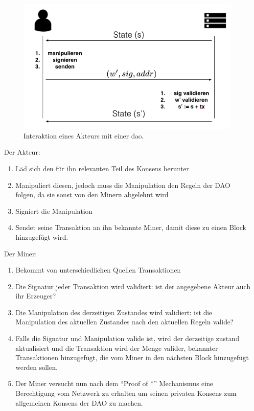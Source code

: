 \documentclass[a4paper,12pt]{report}
\begin{document}
\begin{figure}[ht]
  \centering
  \includegraphics[width=1\textwidth]{bilder/interaktion.png}
  \caption{Interaktion eines Akteurs mit einer dao.}
  \label{intSeq}
\end{figure}

Der Akteur:
\begin{enumerate}
  \item Läd sich den für ihn relevanten Teil des Konsens herunter
  \item Manipuliert diesen, jedoch muss die Manipulation den Regeln der DAO folgen, da sie sonst von den Minern abgelehnt wird
  \item Signiert die Manipulation
  \item Sendet seine Transaktion an ihn bekannte Miner, damit diese zu einen Block hinzugefügt wird.
\end{enumerate}

Der Miner:
\begin{enumerate}
  \item Bekommt von unterschiedlichen Quellen Transaktionen
  \item Die Signatur jeder Transaktion wird validiert: ist der angegebene Akteur auch ihr Erzeuger?
  \item Die Manipulation des derzeitigen Zustandes wird validiert: ist die Manipulation des aktuellen Zustandes nach den aktuellen Regeln valide?
  \item Falls die Signatur und Manipulation valide ist, wird der derzeitige zustand aktualisiert und die Transaktion wird der Menge valider, bekannter Transaktionen hinzugefügt, die vom Miner in den nächsten Block hinzugefügt werden sollen.
  \item Der Miner versucht nun nach dem ``Proof of *'' Mechanismus eine Berechtigung vom Netzwerk zu erhalten um seinen privaten Konsens zum allgemeinen Konsens der DAO zu machen.
\end{enumerate}
\end{document}
